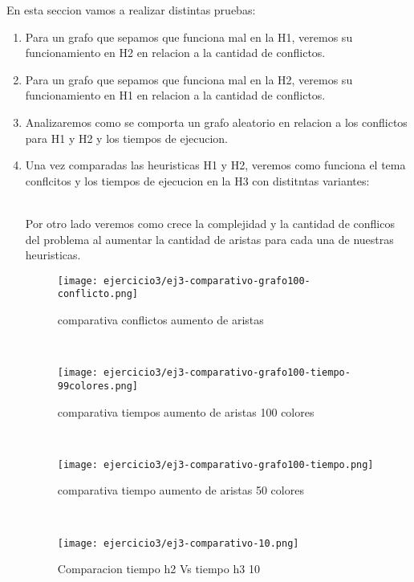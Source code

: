En esta seccion vamos a realizar distintas pruebas:
\begin{enumerate}
 \item Para un grafo que sepamos que funciona mal en la H1, veremos su funcionamiento en H2 en relacion a la cantidad de conflictos.
 \item Para un grafo que sepamos que funciona mal en la H2, veremos su funcionamiento en H1 en relacion a la cantidad de conflictos.
 \item Analizaremos como se comporta un grafo aleatorio en relacion a los conflictos para H1 y H2 y los tiempos de ejecucion.
 \item Una vez comparadas las heuristicas H1 y H2, veremos como funciona el tema conflcitos y los tiempos de ejecucion en la H3 con distitntas variantes:
 \begin{enumerate}
 \end{enumerate}\\
 
Por otro lado veremos como crece la complejidad y la cantidad de conflicos del problema al aumentar la cantidad de aristas para cada una de nuestras heuristicas. \\
\begin{figure}[h!]
\texttt{[image: ejercicio3/ej3-comparativo-grafo100-conflicto.png]}
\centering
\caption{comparativa conflictos aumento de aristas}
\label{overflow3}
\end{figure}
 \pagebreak
\\ 
\begin{figure}[h!]
\texttt{[image: ejercicio3/ej3-comparativo-grafo100-tiempo-99colores.png]}
\centering
\caption{comparativa tiempos aumento de aristas 100 colores}
\label{overflow3}
\end{figure}
\\

\begin{figure}[h!]
\texttt{[image: ejercicio3/ej3-comparativo-grafo100-tiempo.png]}
\centering
\caption{comparativa tiempo aumento de aristas 50 colores}
\label{overflow3}
\end{figure}
\\
\pagebreak
\newpage
\begin{figure}[h!]
\texttt{[image: ejercicio3/ej3-comparativo-10.png]}
\centering
\caption{Comparacion tiempo h2 Vs tiempo h3 10}
\label{overflow3}
\end{figure}




\end{enumerate}
